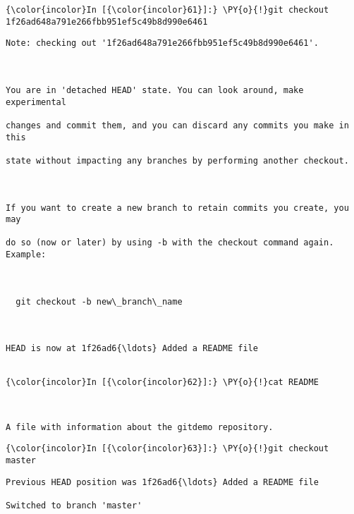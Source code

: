     \begin{Verbatim}[commandchars=\\\{\}]
{\color{incolor}In [{\color{incolor}61}]:} \PY{o}{!}git checkout 1f26ad648a791e266fbb951ef5c49b8d990e6461
\end{Verbatim}

    \begin{Verbatim}[commandchars=\\\{\}]
Note: checking out '1f26ad648a791e266fbb951ef5c49b8d990e6461'.



You are in 'detached HEAD' state. You can look around, make experimental

changes and commit them, and you can discard any commits you make in this

state without impacting any branches by performing another checkout.



If you want to create a new branch to retain commits you create, you may

do so (now or later) by using -b with the checkout command again. Example:



  git checkout -b new\_branch\_name



HEAD is now at 1f26ad6{\ldots} Added a README file


    \end{Verbatim}



    \begin{Verbatim}[commandchars=\\\{\}]
{\color{incolor}In [{\color{incolor}62}]:} \PY{o}{!}cat README
\end{Verbatim}

    \begin{Verbatim}[commandchars=\\\{\}]


A file with information about the gitdemo repository.
    \end{Verbatim}



    \begin{Verbatim}[commandchars=\\\{\}]
{\color{incolor}In [{\color{incolor}63}]:} \PY{o}{!}git checkout master 
\end{Verbatim}

    \begin{Verbatim}[commandchars=\\\{\}]
Previous HEAD position was 1f26ad6{\ldots} Added a README file

Switched to branch 'master'


    \end{Verbatim}

